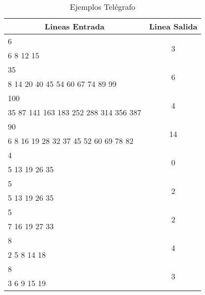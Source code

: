 \begin{table}[htb]
\centering
\begin{tabular}{|l|c|}
\hline
\multicolumn{1}{|c|}{Lineas Entrada}  & \multicolumn{1}{l|}{Linea Salida} \\ \hline
6                                     & \multirow{2}{*}{3}                \\ \cline{1-1}
6 8 12 15                             &                                   \\ \hline
35                                    & \multirow{2}{*}{6}                \\ \cline{1-1}
8 14 20 40 45 54 60 67 74 89 99       &                                   \\ \hline
100                                   & \multirow{2}{*}{4}                \\ \cline{1-1}
35 87 141 163 183 252 288 314 356 387 &                                   \\ \hline
90                                    & \multirow{2}{*}{14}               \\ \cline{1-1}
6 8 16 19 28 32 37 45 52 60 69 78 82  &                                   \\ \hline
4                                     & \multirow{2}{*}{0}                \\ \cline{1-1}
5 13 19 26 35                         &                                   \\ \hline
5                                     & \multirow{2}{*}{2}                \\ \cline{1-1}
5 13 19 26 35                         &                                   \\ \hline
5                                     & \multirow{2}{*}{2}                \\ \cline{1-1}
7 16 19 27 33                         &                                   \\ \hline
8                                     & \multirow{2}{*}{4}                \\ \cline{1-1}
2 5 8 14 18                           &                                   \\ \hline
8                                     & \multirow{2}{*}{3}                \\ \cline{1-1}
3 6 9 15 19                           &                                   \\ \hline
\end{tabular}
\caption{Ejemplos Tel\'egrafo}
\label{my-label}
\end{table}


